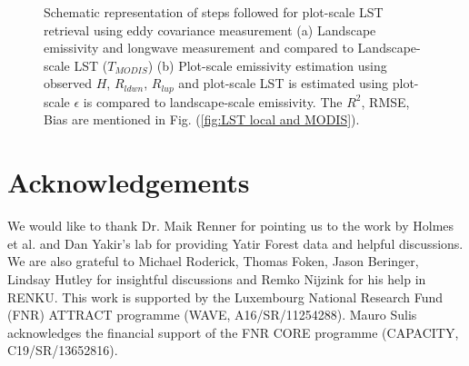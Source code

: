 \documentclass[fleqn,10pt]{wlscirep}
\begin{document}
\begin{figure}[H]
\begin{subfigure}{.5\textwidth}
{}
\end{subfigure}
\caption{Schematic representation of steps followed for plot-scale LST retrieval using eddy covariance measurement (a) Landscape emissivity and longwave measurement and compared to Landscape-scale LST ($T_{MODIS}$) (b) Plot-scale emissivity estimation using observed $H$, $R_{ldwn}$, $R_{lup}$ and plot-scale LST is estimated using plot-scale $\epsilon$ is compared to landscape-scale emissivity. The $R^{2}$, RMSE, Bias are mentioned in Fig. (\ref{fig:LST local and MODIS}).}
\label{fig:flow_chart}
\end{figure}
\section{Acknowledgements}
We would like to thank Dr. Maik Renner for pointing us to the work by Holmes et al. and Dan Yakir's lab for providing Yatir Forest data and helpful discussions. We are also grateful to Michael Roderick, Thomas Foken, Jason Beringer, Lindsay Hutley for insightful discussions and Remko Nijzink for his help in RENKU. This work is supported by the Luxembourg National Research Fund (FNR) ATTRACT programme (WAVE, A16/SR/11254288). Mauro Sulis acknowledges the financial support of the FNR CORE programme (CAPACITY, C19/SR/13652816).


%



%
\end{document}
